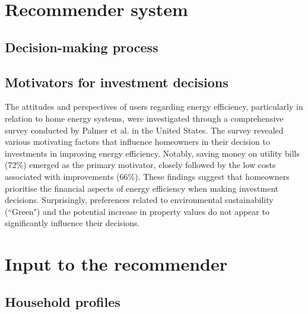 \section{Recommender system}

\subsection{Decision-making process}


\subsection{Motivators for investment decisions}

The attitudes and perspectives of users regarding energy efficiency, particularly in relation to home energy systems, were investigated through a comprehensive survey conducted by Palmer et al. \cite{informationgap} in the United States.
The survey revealed various motivating factors that influence homeowners in their decision to investments in improving energy efficiency. 
Notably, saving money on utility bills (72\%) emerged as the primary motivator, 
closely followed by the low costs associated with improvements (66\%). 
These findings suggest that homeowners prioritise the financial aspects of energy efficiency when making investment decisions. 
Surprisingly, preferences related to environmental sustainability (``Green") and the potential increase in property values do not appear to significantly influence their decisions.


\section{Input to the recommender}


\subsection{Household profiles}

